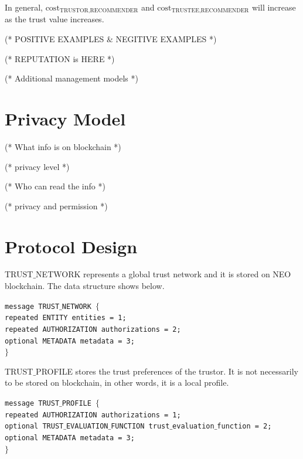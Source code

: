 \documentclass{article}
\begin{document}
In general, \(\text{cost}_{\text{TRUSTOR},\text{RECOMMENDER}}\) and \(\text{cost}_{\text{TRUSTEE},\text{RECOMMENDER}}\) will increase as the trust
value increases.

(* POSITIVE EXAMPLES $\&$ NEGITIVE EXAMPLES *)

(* REPUTATION is HERE *)

(* Additional management models *)


\section{Privacy Model}

(* What info is on blockchain *)

(* privacy level *)

(* Who can read the info *)

(* privacy and permission *)


\section{Protocol Design}

TRUST$\_$NETWORK represents a global trust network and it is stored on NEO blockchain. The data structure shows below.


\noindent \texttt{message TRUST$\_$NETWORK $\{$\\
\hspace*{2.ex} repeated ENTITY entities = 1;\\
\hspace*{2.ex} repeated AUTHORIZATION authorizations = 2;\\
\hspace*{2.ex} optional METADATA metadata = 3;\\
$\}$}

TRUST$\_$PROFILE stores the trust preferences of the trustor. It is not necessarily to be stored on blockchain, in other words, it is a local profile.


\noindent \texttt{message TRUST$\_$PROFILE $\{$\\
\hspace*{2.ex} repeated AUTHORIZATION authorizations = 1;\\
\hspace*{2.ex} optional TRUST$\_$EVALUATION$\_$FUNCTION trust$\_$evaluation$\_$function = 2;\\
\hspace*{2.ex} optional METADATA metadata = 3;\\
$\}$}
\end{document}
